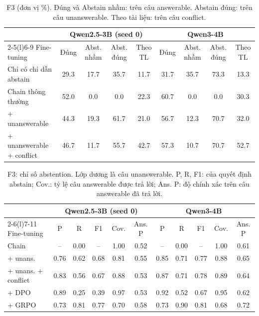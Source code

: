 \documentclass[11pt]{article}
\begin{document}
\begin{table}[h]
\centering\footnotesize
\caption{F3 (đơn vị \%). Đúng và Abstain nhầm: trên câu answerable. Abstain đúng: trên câu unanswerable.
Theo tài liệu: trên câu conflict.}
\setlength{\tabcolsep}{3.5pt}
\begin{tabular}{lcccccccc}
\toprule
 & \multicolumn{4}{c}{Qwen2.5-3B (seed 0)} & \multicolumn{4}{c}{Qwen3-4B} \\
\cmidrule(lr){2-5}\cmidrule(l){6-9}
Fine-tuning & Đúng & Abst. nhầm & Abst. đúng & Theo TL & Đúng & Abst. nhầm & Abst. đúng & Theo TL \\
\midrule
Chỉ có chỉ dẫn abstain & 29.3 & 17.7 & 35.7 & 11.7 & 31.7 & 35.7 & 73.3 & 13.3 \\
Chain thông thường & 52.0 & 0.0 & 0.0 & 22.3 & 60.7 & 0.0 & 0.0 & 30.3 \\
+ unanswerable & 44.3 & 19.3 & 61.7 & 21.0 & 56.7 & 12.3 & 70.7 & 32.0 \\
+ unanswerable + conflict & 46.7 & 11.7 & 55.7 & 42.7 & 57.3 & 10.7 & 70.7 & 52.7 \\
\bottomrule
\end{tabular}
\end{table}

\begin{table}[h]
\centering\footnotesize
\caption{F3: chỉ số abstention. Lớp dương là câu unanswerable. P, R, F1: của quyết định abstain; Cov.: tỷ
lệ câu answerable được trả lời; Ans. P: độ chính xác trên câu answerable đã trả lời.}
\setlength{\tabcolsep}{3.5pt}
\begin{tabular}{lcccccccccc}
\toprule
 & \multicolumn{5}{c}{Qwen2.5-3B (seed 0)} & \multicolumn{5}{c}{Qwen3-4B} \\
\cmidrule(lr){2-6}\cmidrule(l){7-11}
Fine-tuning & P & R & F1 & Cov. & Ans. P & P & R & F1 & Cov. & Ans. P \\
\midrule
Chain & -- & 0.00 & -- & 1.00 & 0.52 & -- & 0.00 & -- & 1.00 & 0.61 \\
+ unans. & 0.76 & 0.62 & 0.68 & 0.81 & 0.55 & 0.85 & 0.71 & 0.77 & 0.88 & 0.65 \\
+ unans. + conflict & 0.83 & 0.56 & 0.67 & 0.88 & 0.53 & 0.87 & 0.71 & 0.78 & 0.89 & 0.64 \\
\quad + DPO & 0.89 & 0.25 & 0.39 & 0.97 & 0.53 & 0.92 & 0.52 & 0.67 & 0.95 & 0.62 \\
\quad + GRPO & 0.73 & 0.81 & 0.77 & 0.70 & 0.58 & 0.73 & 0.90 & 0.81 & 0.68 & 0.72 \\
\bottomrule
\end{tabular}
\end{table}
\end{document}
